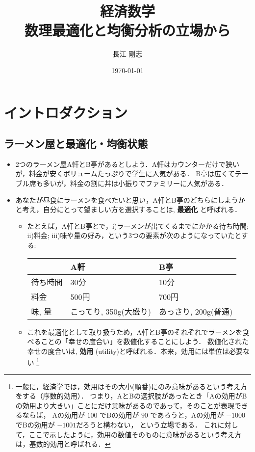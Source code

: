 \documentclass[platex,12pt,a4paper]{jsarticle}
\author{長江 剛志}
\date{\today}
\title{経済数学\\\medskip
\large 数理最適化と均衡分析の立場から}
\begin{document}
\maketitle
\tableofcontents

\section{イントロダクション}
\label{sec:org303a2b8}
\subsection{ラーメン屋と最適化・均衡状態}
\label{sec:org0c472b2}
\begin{itemize}
\item 2つのラーメン屋A軒とB亭があるとしよう．A軒はカウンターだけで狭いが，料金が安くボリュームたっぷりで学生に人気がある．
B亭は広くてテーブル席も多いが，料金の割に丼は小振りでファミリーに人気がある．
\item あなたが昼食にラーメンを食べたいと思い，A軒とB亭のどちらにしようかと考え，自分にとって望ましい方を選択することは, \textbf{\textbf{最適化}} と呼ばれる．
\begin{itemize}
\item たとえば，A軒とB亭とで，i)ラーメンが出てくるまでにかかる待ち時間; ii)料金; iii)味や量の好み，という3つの要素が次のようになっていたとする:
\begin{center}
\begin{tabular}{lll}
\hline
 & A軒 & B亭\\
\hline
待ち時間 & 30分 & 10分\\
料金 & 500円 & 700円\\
味, 量 & こってり, 350g(大盛り) & あっさり, 200g(普通)\\
\hline
\end{tabular}
\end{center}
\item これを最適化として取り扱うため，A軒とB亭のそれぞれでラーメンを食べることの「幸せの度合い」を数値化することにしよう．
数値化された幸せの度合いは, \textbf{\textbf{効用}} (utility)と呼ばれる．本来，効用には単位は必要ない
\footnote{
一般に，経済学では，効用はその大小(順番)にのみ意味があるという考え方をする（序数的効用）．
つまり，AとBの選択肢があったとき「Aの効用がBの効用より大きい」ことにだけ意味があるのであって，そのことが表現できるならば，
Aの効用が \(100\) でBの効用が \(90\) であろうと，Aの効用が \(-1000\) でBの効用が \(-1001\)だろうと構わない，
という立場である．
これに対して，ここで示したように，効用の数値そのものに意味があるという考え方は，基数的効用と呼ばれる．
}
\end{itemize}
\end{itemize}
\end{document}
